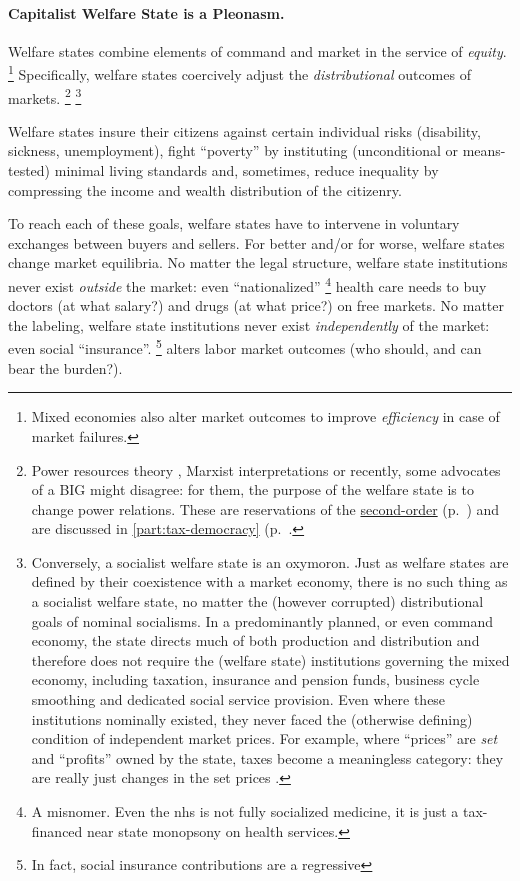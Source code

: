 \paragraph{Capitalist Welfare State is a Pleonasm.}
	\label{sec:interface}
Welfare states combine elements of command and market in the service of \emph{equity}.
\footnote{
	Mixed economies also alter market outcomes to improve \emph{efficiency} in case of market failures.
}
Specifically, welfare states coercively adjust the \emph{distributional} outcomes of markets.
\footnote{
	Power resources theory \citep[for example][]{Korpi2003}, Marxist interpretations \citep[for example][]{Offe1972} or recently, some advocates of a \gls{BIG} might disagree:
	for them, the purpose of the welfare state is to change power relations.
	These are reservations of the \hyperref[sec:epistemology]{second-order} (p.~\pageref{sec:epistemology}) and are discussed in \autoref{part:tax-democracy} (p.~\pageref{part:tax-democracy}.
}
\footnote{
	Conversely, a socialist welfare state is an oxymoron.
	Just as welfare states are defined by their coexistence with a market economy, there is no such thing as a socialist welfare state, no matter the (however corrupted) distributional goals of nominal socialisms.
	In a predominantly planned, or even command economy, the state directs much of both production and distribution and therefore does not require the (welfare state) institutions governing the mixed economy, including taxation, insurance and pension funds, business cycle smoothing and dedicated social service provision.
	Even where these institutions nominally existed, they never faced the (otherwise defining) condition of independent market prices.
	For example, where ``prices'' are \emph{set} and ``profits'' owned by the state, taxes become a meaningless category:
	they are really just changes in the set prices \citep[for example,][23]{Bonker2006}.
}

Welfare states insure their citizens against certain individual risks (disability, sickness, unemployment), fight ``poverty'' by instituting (unconditional or means-tested) minimal living standards and, sometimes, reduce inequality by compressing the income and wealth distribution of the citizenry.

To reach each of these goals, welfare states have to intervene in voluntary exchanges between buyers and sellers.
For better and/or for worse, welfare states change market equilibria.
No matter the legal structure, welfare state institutions never exist \emph{outside} the market:
even ``nationalized''
\footnote{
	A misnomer.
	Even the \gls{nhs} is not fully socialized medicine, it is just a tax-financed near state monopsony on health services.
}
health care needs to buy doctors (at what salary?) and drugs (at what price?) on free markets.
No matter the labeling, welfare state institutions never exist \emph{independently} of the market:
even social ``insurance''.
\footnote{
	In fact, social insurance contributions are a regressive 
}
alters labor market outcomes (who should, and can bear the burden?).

